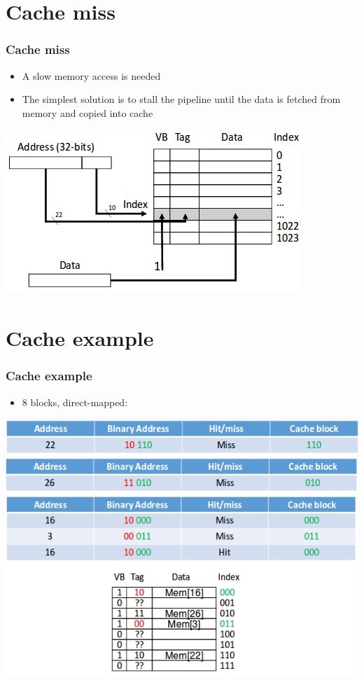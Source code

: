 \documentclass{beamer}
\begin{document}
\section{Cache miss}
\begin{frame}
\frametitle{Cache miss}
\begin{itemize}
\item A slow memory access is needed
\item The simplest solution is to stall the pipeline until the data is fetched from memory and copied into cache
\end{itemize}
\includegraphics[scale=0.4]{miss.png}
\end{frame}

\section{Cache example}
\begin{frame}
\frametitle{Cache example}
\begin{itemize}
\item 8 blocks, direct-mapped:
\end{itemize}
\includegraphics[scale=0.4]{ex1.png}\\
\includegraphics[scale=0.4]{ex2.png}\\
\includegraphics[scale=0.4]{ex3.png}
\end{frame}
\end{document}
